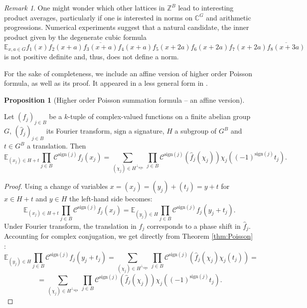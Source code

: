 \documentclass{amsart}
\theoremstyle{definition}
\newtheorem{proposition}[theorem]{Proposition}
\theoremstyle{remark}
\newtheorem{remark}[theorem]{Remark}
\numberwithin{equation}{section}
\begin{document}
\begin{remark}
One might wonder which other lattices in $\mathbb{Z}^B$ lead to interesting product averages, particularly if one is interested in norms on $\mathbb{C}^G$ and arithmetic progressions. Numerical experiments suggest that a natural candidate, the inner product given by the degenerate cubic formula 
$$ \mathbb{E}_{x,a\in G} f_1(x)\overline{f_2(x+a) f_3(x+a) f_4(x+a)}f_5(x+2a)f_6(x+2a)f_7(x+2a)\overline{f_8(x+3a)} $$
is not positive definite and, thus, does not define a norm. 
\end{remark}

For the sake of completeness, we include an affine version of higher order Poisson formula, as well as its proof. It appeared in a less general form in \cite{Rak21}.

\begin{proposition}[Higher order Poisson summation formula -- an affine version]
\label{prop:PoissonAf}

Let $(f_j)_{j \in B}$ be a $k$-tuple of complex-valued functions on a finite abelian group $G$, $(\widehat{f}_j)_{j \in B}$ its Fourier transform, $\mathrm{sign}$ a signature, $H$ a subgroup of $G^B$ and $t \in G^B$ a translation. Then
\begin{equation}
\label{PoissonAf}
     \mathbb{E}_{(x_j) \in H + t }  \prod_{j \in B}  \mathcal{C}^{\mathrm{sign}(j)} f_j(x_j) = \sum_{(\chi_j) \in H^{\perp_{\mathrm{sign}}}} \, \prod_{j \in B}  \mathcal{C}^{\mathrm{sign}(j)} \left( \widehat{f}_j(\chi_j)\right) \chi_j((-1)^{\mathrm{sign}(j)} t_j) . 
\end{equation}
\end{proposition} 
\begin{proof} Using a change of variables $x= (x_j) = (y_j) + (t_j) = y + t$ for $x\in H+t$ and $y \in H$ the left-hand side becomes:
\[ \mathbb{E}_{(x_j) \in H + t }  \prod_{j \in B}  \mathcal{C}^{\mathrm{sign}(j)} f_j(x_j) =
 \mathbb{E}_{(y_j) \in H }  \prod_{j \in B}  \mathcal{C}^{\mathrm{sign}(j)} f_j(y_j + t_j).\]
Under Fourier transform, the translation in $f_j$ corresponds to a phase shift in $\widehat{f}_j$. Accounting for complex conjugation, we get directly from Theorem \eqref{thm:Poisson} :
\[\mathbb{E}_{(y_j) \in H }  \prod_{j \in B}  \mathcal{C}^{\mathrm{sign}(j)} f_j(y_j + t_j) = \sum_{(\chi_j) \in H^{\perp_{\mathrm{sign}}}} \, \prod_{j \in B}  \mathcal{C}^{\mathrm{sign}(j)} \left( \widehat{f}_j(\chi_j) \chi_j(t_j) \right) = \]
\[= \sum_{(\chi_j) \in H^{\perp_{\mathrm{sign}}}} \, \prod_{j \in B}  \mathcal{C}^{\mathrm{sign}(j)} \left( \widehat{f}_j(\chi_j)\right) \chi_j((-1)^{\mathrm{sign}(j)} t_j).\]
\end{proof}
\end{document}
